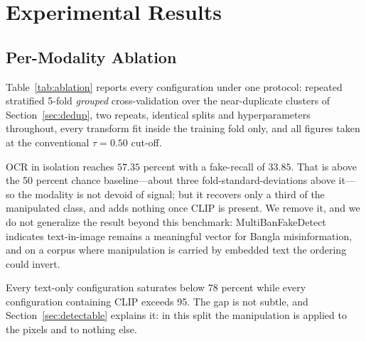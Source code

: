 %
%

\section{Experimental Results}

\subsection{Per-Modality Ablation}
\label{sec:ablation}

Table~\ref{tab:ablation} reports every configuration under one protocol:
repeated stratified 5-fold \emph{grouped} cross-validation over the
near-duplicate clusters of Section~\ref{sec:dedup}, two repeats, identical
splits and hyperparameters throughout, every transform fit inside the training
fold only, and all figures taken at the conventional $\tau = 0.50$ cut-off.

OCR in isolation reaches $57.35$ percent with a fake-recall of $33.85$. That is
above the 50 percent chance baseline---about three fold-standard-deviations
above it---so the modality is not devoid of signal; but it recovers only a
third of the manipulated class, and adds nothing once CLIP is present. We
remove it, and we do not generalize the result beyond this benchmark:
MultiBanFakeDetect \cite{multibanfake} indicates text-in-image remains a
meaningful vector for Bangla misinformation, and on a corpus where
manipulation is carried by embedded text the ordering could invert.

Every text-only configuration saturates below 78 percent while every
configuration containing CLIP exceeds 95. The gap is not subtle, and
Section~\ref{sec:detectable} explains it: in this split the manipulation is
applied to the pixels and to nothing else.

